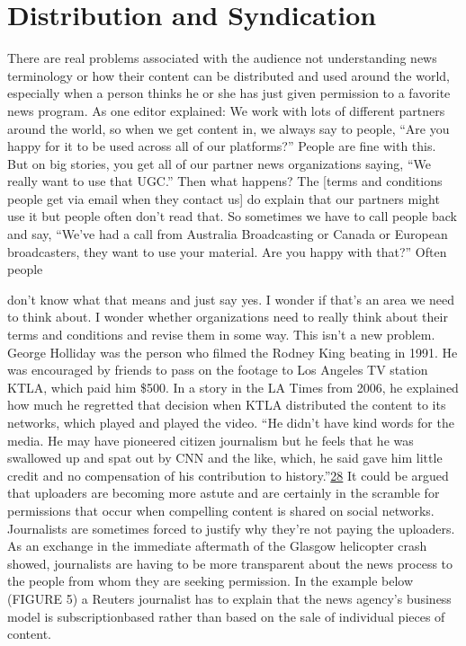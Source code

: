 \documentclass[symmetric, notoc, nobib]{towcenter-book}
\begin{document}
\section{Distribution and Syndication}
There are real problems associated with the audience not understanding
news terminology or how their content can be distributed and used around
the world, especially when a person thinks he or she has just given permission
to a favorite news program. As one editor explained:
We work with lots of different partners around the world, so when
we get content in, we always say to people, ``Are you happy for it to
be used across all of our platforms?'' People are fine with this. But on
big stories, you get all of our partner news organizations saying, ``We
really want to use that UGC.'' Then what happens? The [terms and
conditions people get via email when they contact us] do explain that
our partners might use it but people often don't read that. So sometimes
we have to call people back and say, ``We've had a call from
Australia Broadcasting or Canada or European broadcasters, they
want to use your material. Are you happy with that?'' Often people

don't know what that means and just say yes. I wonder if that's an
area we need to think about. I wonder whether organizations need
to really think about their terms and conditions and revise them in
some way.
This isn't a new problem. George Holliday was the person who filmed the
Rodney King beating in 1991. He was encouraged by friends to pass on the
footage to Los Angeles TV station KTLA, which paid him \$500. In a story
in the LA Times from 2006, he explained how much he regretted that decision
when KTLA distributed the content to its networks, which played and
played the video. ``He didn't have kind words for the media. He may have
pioneered citizen journalism but he feels that he was swallowed up and spat
out by CNN and the like, which, he said gave him little credit and no compensation
of his contribution to history.''{\href{#endnotes}{28}}
It could be argued that uploaders are becoming more astute and are certainly
in the scramble for permissions that occur when compelling content
is shared on social networks. Journalists are sometimes forced to justify
why they're not paying the uploaders. As an exchange in the immediate
aftermath of the Glasgow helicopter crash showed, journalists are having to
be more transparent about the news process to the people from whom they
are seeking permission. In the example below (FIGURE 5) a Reuters journalist
has to explain that the news agency's business model is subscriptionbased
rather than based on the sale of individual pieces of content.
\end{document}
